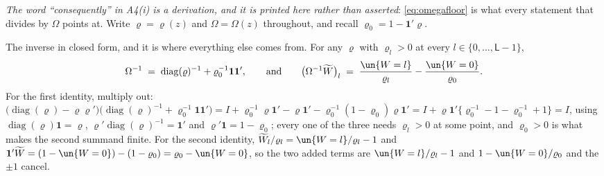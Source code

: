 \emph{The word ``consequently'' in A4(i) is a derivation, and it is printed here rather than asserted}:
\eqref{eq:omegafloor} is what every statement that divides by $\Omega$ points at. Write
$\varrho=\varrho(z)$ and $\Omega=\Omega(z)$ throughout, and recall $\varrho_0=1-\mathbf1'\varrho$.

The inverse in closed form, and it is where everything else comes from. For any
$\varrho$ with $\varrho_l>0$ at every $l\in\{0,\dots,\mathsf L-1\}$,
\begin{equation}\label{eq:omegainv}
\Omega^{-1}\;=\;\operatorname{diag}(\varrho)^{-1}+\varrho_0^{-1}\mathbf1\mathbf1' ,
\qquad\text{and}\qquad
\big(\Omega^{-1}\widetilde W\big)_l\;=\;\frac{\un\{W=l\}}{\varrho_l}-\frac{\un\{W=0\}}{\varrho_0} .
\end{equation}
For the first identity, multiply out:
$\big(\operatorname{diag}(\varrho)-\varrho\varrho'\big)\big(\operatorname{diag}(\varrho)^{-1}+\varrho_0^{-1}\mathbf1\mathbf1'\big)
=I+\varrho_0^{-1}\varrho\mathbf1'-\varrho\mathbf1'-\varrho_0^{-1}(1-\varrho_0)\varrho\mathbf1'
=I+\varrho\mathbf1'\big\{\varrho_0^{-1}-1-\varrho_0^{-1}+1\big\}=I$,
using $\operatorname{diag}(\varrho)\mathbf1=\varrho$, $\varrho'\operatorname{diag}(\varrho)^{-1}=\mathbf1'$
and $\varrho'\mathbf1=1-\varrho_0$; every one of the three needs $\varrho_l>0$ at some point, and
$\varrho_0>0$ is what makes the second summand finite. For the
second identity, $\widetilde W_l/\varrho_l=\un\{W=l\}/\varrho_l-1$ and
$\mathbf1'\widetilde W=(1-\un\{W=0\})-(1-\varrho_0)=\varrho_0-\un\{W=0\}$, so the two added terms are
$\un\{W=l\}/\varrho_l-1$ and $1-\un\{W=0\}/\varrho_0$ and the $\pm1$ cancel.

